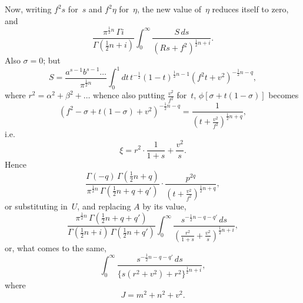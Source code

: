 \documentclass[11pt,a4paper]{article}
\begin{document}
Now, writing $f^2s$ for~$s$ and $f^2\eta$ for~$\eta$, the new value of~$\eta$ reduces itself to zero, and
\[
\frac{\pi^{\frac{1}{2}n}\,\Gamma i}{\Gamma(\frac{1}{2}n+i)} \int_0^\infty \frac{S\,ds}{(Rs+f^2)^{\frac{1}{2}n+i}}.
\]
Also $\sigma = 0$; but
\[
S = \frac{a^{s-1}b^{s-1}\ldots}{\pi^{\frac{1}{2}n}} \int_0^1 dt \, t^{-\frac{1}{2}}(1-t)^{\frac{1}{2}n-1} (f^2t + v^2)^{-\frac{1}{2}n-q},
\]
where $r^2 = \alpha^2 + \beta^2 + \ldots$ whence also putting $\frac{v^2}{f^2}$ for~$t$, $\phi[\sigma + t(1-\sigma)]$ becomes
\[
(f^2 - \sigma + t(1-\sigma) + v^2)^{-\frac{1}{2}n-q} = \frac{1}{(t + \frac{v^2}{f^2})^{\frac{1}{2}n+q}},
\]
i.e.
\[
\xi = r^2 \cdot \frac{1}{1+s} + \frac{v^2}{s}.
\]
Hence
\[
\frac{\Gamma(-q)\,\Gamma(\frac{1}{2}n+q)}{\pi^{\frac{1}{2}n}\,\Gamma(\frac{1}{2}n+q+q')} \cdot \frac{p^{2q}}{(t + \frac{v^2}{f^2})^{\frac{1}{2}n+q}},
\]
or substituting in~$U$, and replacing $A$ by its value,
\[
\frac{\pi^{\frac{1}{2}n}\,\Gamma(\frac{1}{2}n+q+q')}{\Gamma(\frac{1}{2}n+i)\,\Gamma(\frac{1}{2}n+q')} \int_0^\infty \frac{s^{-\frac{1}{2}n-q-q'}\,ds}{\left(\frac{r^2}{1+s} + \frac{v^2}{s}\right)^{\frac{1}{2}n+i}},
\]
or, what comes to the same,
\[
\int_0^\infty \frac{s^{-\frac{1}{2}n-q-q'}\,ds}{\{s(r^2+v^2) + r^2\}^{\frac{1}{2}n+i}},
\]
where
\[
J = m^2 + n^2 + v^2.
\]
\end{document}
